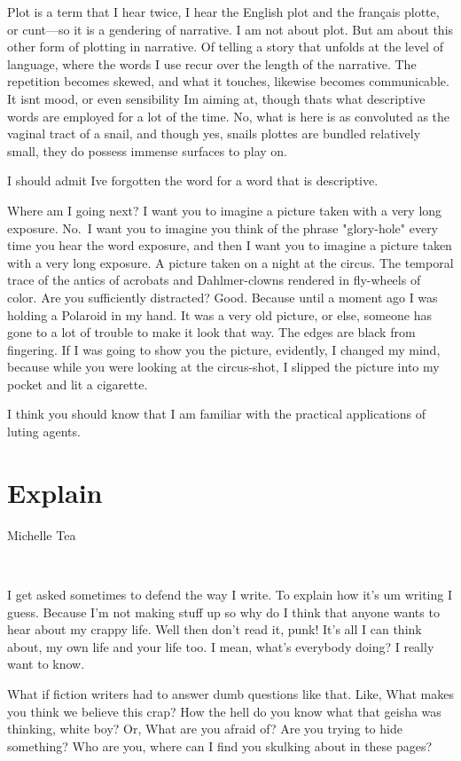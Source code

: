 Plot is a term that I hear twice, I hear the English plot and the
français plotte, or cunt---so it is a gendering of narrative. I am not
about plot. But am about this other form of plotting in narrative. Of
telling a story that unfolds at the level of language, where the words I
use recur over the length of the narrative. The repetition becomes
skewed, and what it touches, likewise becomes communicable. It isnt
mood, or even sensibility Im aiming at, though thats what descriptive
words are employed for a lot of the time. No, what is here is as
convoluted as the vaginal tract of a snail, and though yes, snails
plottes are bundled relatively small, they do possess immense surfaces
to play on.

I should admit Ive forgotten the word for a word that is descriptive.

Where am I going next? I want you to imagine a picture taken with a very
long exposure. No.~I want you to imagine you think of the phrase
"glory-hole" every time you hear the word exposure, and then I want you
to imagine a picture taken with a very long exposure. A picture taken on
a night at the circus. The temporal trace of the antics of acrobats and
Dahlmer-clowns rendered in fly-wheels of color. Are you sufficiently
distracted? Good. Because until a moment ago I was holding a Polaroid in
my hand. It was a very old picture, or else, someone has gone to a lot
of trouble to make it look that way. The edges are black from fingering.
If I was going to show you the picture, evidently, I changed my mind,
because while you were looking at the circus-shot, I slipped the picture
into my pocket and lit a cigarette.

I think you should know that I am familiar with the practical
applications of luting agents.

\hypertarget{explain}{%
\section{Explain}\label{explain}}

Michelle Tea

~

I get asked sometimes to defend the way I write. To explain how it's um
writing I guess. Because I'm not making stuff up so why do I think that
anyone wants to hear about my crappy life. Well then don't read it,
punk! It's all I can think about, my own life and your life too. I mean,
what's everybody doing? I really want to know.

What if fiction writers had to answer dumb questions like that. Like,
What makes you think we believe this crap? How the hell do you know what
that geisha was thinking, white boy? Or, What are you afraid of? Are you
trying to hide something? Who are you, where can I find you skulking
about in these pages?

